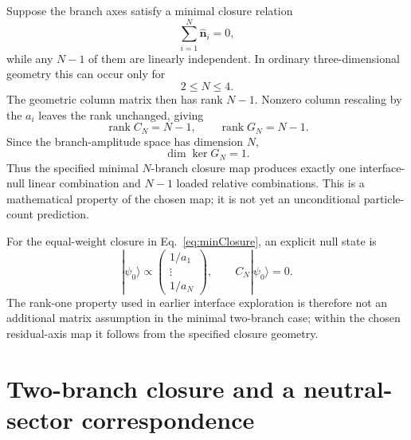 \documentclass[10pt]{article}
\newcommand{\rank}{\operatorname{rank}}
\begin{document}
Suppose the branch axes satisfy a minimal closure relation
\begin{equation}
\sum_{i=1}^{N}\hat{\bm n}_i=0,
\label{eq:minClosure}
\end{equation}
while any $N-1$ of them are linearly independent. In ordinary three-dimensional geometry this can occur only for
\begin{equation}
2\le N\le4.
\label{eq:Nrange}
\end{equation}
The geometric column matrix then has rank $N-1$. Nonzero column rescaling by the $a_i$ leaves the rank unchanged, giving
\begin{equation}
\boxed{
\rank C_N=N-1,
\qquad
\rank G_N=N-1.
}
\label{eq:rankN}
\end{equation}
Since the branch-amplitude space has dimension $N$,
\begin{equation}
\boxed{
\dim\ker G_N=1.
}
\label{eq:oneNull}
\end{equation}
Thus the specified minimal $N$-branch closure map produces exactly one interface-null linear combination and $N-1$ loaded relative combinations. This is a mathematical property of the chosen map; it is not yet an unconditional particle-count prediction.

For the equal-weight closure in Eq.~\eqref{eq:minClosure}, an explicit null state is
\begin{equation}
|\psi_0\rangle
\propto
\begin{pmatrix}
1/a_1\\
\vdots\\
1/a_N
\end{pmatrix},
\qquad
C_N|\psi_0\rangle=0.
\label{eq:nullstate}
\end{equation}
The rank-one property used in earlier interface exploration is therefore not an additional matrix assumption in the minimal two-branch case; within the chosen residual-axis map it follows from the specified closure geometry.

\section{Two-branch closure and a neutral-sector correspondence}
\label{sec:twoBranch}
\end{document}
